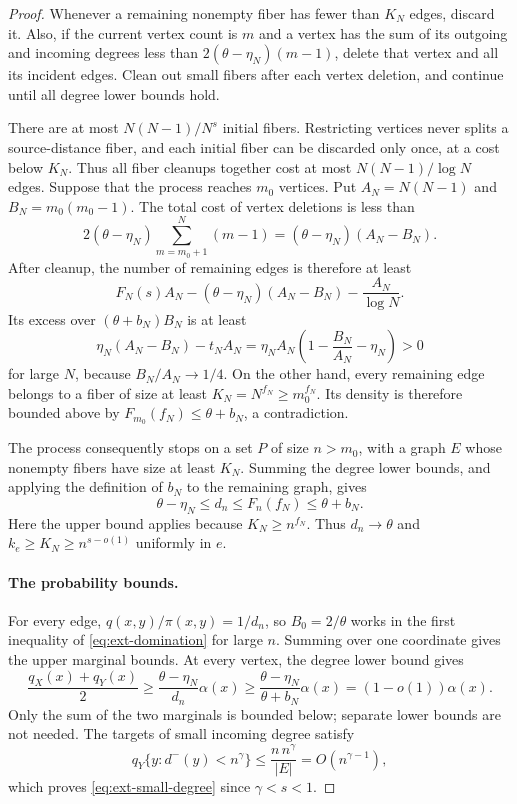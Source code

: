 \begin{proof}
Whenever a remaining nonempty fiber has fewer than $K_N$ edges, discard
it. Also, if the current vertex count is $m$ and a vertex has the sum
of its outgoing and incoming degrees less than
$2(\theta-\eta_N)(m-1)$, delete that vertex and all its incident edges.
Clean out small fibers after each vertex deletion, and continue until
all degree lower bounds hold.

There are at most $N(N-1)/N^s$ initial fibers. Restricting vertices
never splits a source-distance fiber, and each initial fiber can be
discarded only once, at a cost below $K_N$. Thus all fiber cleanups
together cost at most $N(N-1)/\log N$ edges. Suppose that the process
reaches $m_0$ vertices. Put $A_N=N(N-1)$ and
$B_N=m_0(m_0-1)$. The total cost of vertex deletions is less than
\[
 2(\theta-\eta_N)\sum_{m=m_0+1}^{N}(m-1)
 = (\theta-\eta_N)(A_N-B_N).
\]
After cleanup, the number of remaining edges is therefore at least
\[
 F_N(s)A_N-(\theta-\eta_N)(A_N-B_N)-\frac{A_N}{\log N}.
\]
Its excess over $(\theta+b_N)B_N$ is at least
\[
 \eta_N(A_N-B_N)-t_NA_N
 =\eta_NA_N\left(1-\frac{B_N}{A_N}-\eta_N\right)>0
\]
for large $N$, because $B_N/A_N\to1/4$. On the other hand, every
remaining edge belongs to a fiber of size at least
$K_N=N^{f_N}\ge m_0^{f_N}$. Its density is therefore bounded above by
$F_{m_0}(f_N)\le\theta+b_N$, a contradiction.

The process consequently stops on a set $P$ of size $n>m_0$, with a
graph $E$ whose nonempty fibers have size at least $K_N$. Summing the
degree lower bounds, and applying the definition of $b_N$ to the
remaining graph, gives
\begin{equation}\label{eq:ext-density}
  \theta-\eta_N\le d_n\le F_n(f_N)\le\theta+b_N.
\end{equation}
Here the upper bound applies because $K_N\ge n^{f_N}$. Thus
$d_n\to\theta$ and $k_e\ge K_N\ge n^{s-o(1)}$ uniformly in $e$.

\paragraph{The probability bounds.}
For every edge, $q(x,y)/\pi(x,y)=1/d_n$, so $B_0=2/\theta$ works
in the first inequality of \eqref{eq:ext-domination} for large $n$.
Summing over one coordinate gives the upper marginal bounds. At every
vertex, the degree lower bound gives
\[
 \frac{q_X(x)+q_Y(x)}2
 \ge\frac{\theta-\eta_N}{d_n}\alpha(x)
 \ge\frac{\theta-\eta_N}{\theta+b_N}\alpha(x)
 =(1-o(1))\alpha(x).
\]
Only the sum of the two marginals is bounded below; separate lower
bounds are not needed. The targets of small incoming degree satisfy
\[
 q_Y\{y:d^-(y)<n^\gamma\}
 \le\frac{n\,n^\gamma}{|E|}=O(n^{\gamma-1}),
\]
which proves \eqref{eq:ext-small-degree} since $\gamma<s<1$.


\end{proof}
